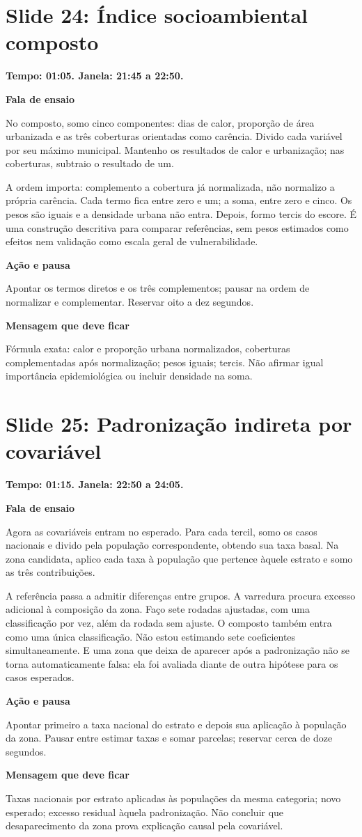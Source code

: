 \documentclass[11pt,a4paper]{article}
\newcommand{\bloco}[1]{\par\Needspace{3\baselineskip}\textbf{#1}\par}
\newcommand{\slide}[2]{\Needspace{13\baselineskip}\section*{Slide #1: #2}}
\begin{document}
\par\begin{minipage}{\textwidth}
\slide{24}{Índice socioambiental composto}
{\color{azul}\textbf{Tempo: 01:05. Janela: 21:45 a 22:50.}}\par
\bloco{Fala de ensaio}
No composto, somo cinco componentes: dias de calor, proporção de área urbanizada e as três coberturas orientadas como carência. Divido cada variável por seu máximo municipal. Mantenho os resultados de calor e urbanização; nas coberturas, subtraio o resultado de um.

A ordem importa: complemento a cobertura já normalizada, não normalizo a própria carência. Cada termo fica entre zero e um; a soma, entre zero e cinco. Os pesos são iguais e a densidade urbana não entra. Depois, formo tercis do escore. É uma construção descritiva para comparar referências, sem pesos estimados como efeitos nem validação como escala geral de vulnerabilidade.
\bloco{Ação e pausa}
Apontar os termos diretos e os três complementos; pausar na ordem de normalizar e complementar. Reservar oito a dez segundos.
\bloco{Mensagem que deve ficar}
Fórmula exata: calor e proporção urbana normalizados, coberturas complementadas após normalização; pesos iguais; tercis. Não afirmar igual importância epidemiológica ou incluir densidade na soma.
\end{minipage}\par\bigskip
\par\begin{minipage}{\textwidth}
\slide{25}{Padronização indireta por covariável}
{\color{azul}\textbf{Tempo: 01:15. Janela: 22:50 a 24:05.}}\par
\bloco{Fala de ensaio}
Agora as covariáveis entram no esperado. Para cada tercil, somo os casos nacionais e divido pela população correspondente, obtendo sua taxa basal. Na zona candidata, aplico cada taxa à população que pertence àquele estrato e somo as três contribuições.

A referência passa a admitir diferenças entre grupos. A varredura procura excesso adicional à composição da zona. Faço sete rodadas ajustadas, com uma classificação por vez, além da rodada sem ajuste. O composto também entra como uma única classificação. Não estou estimando sete coeficientes simultaneamente. E uma zona que deixa de aparecer após a padronização não se torna automaticamente falsa: ela foi avaliada diante de outra hipótese para os casos esperados.
\bloco{Ação e pausa}
Apontar primeiro a taxa nacional do estrato e depois sua aplicação à população da zona. Pausar entre estimar taxas e somar parcelas; reservar cerca de doze segundos.
\bloco{Mensagem que deve ficar}
Taxas nacionais por estrato aplicadas às populações da mesma categoria; novo esperado; excesso residual àquela padronização. Não concluir que desaparecimento da zona prova explicação causal pela covariável.
\end{minipage}\par\bigskip
\end{document}

